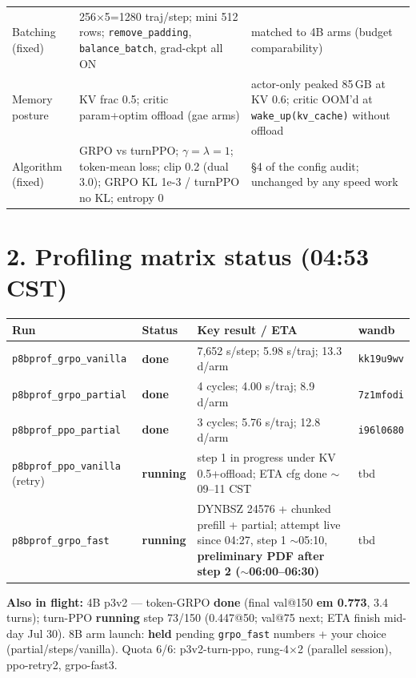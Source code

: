 \documentclass[10pt]{article}
\newcommand{\code}[1]{\texttt{\small #1}}
\newcommand{\ok}{\textcolor{green!55!black}{\textbf{done}}}
\newcommand{\run}{\textcolor{orange!85!black}{\textbf{running}}}
\begin{document}
\begin{tabular}{p{3.4cm}p{4.3cm}p{8.2cm}}
Batching (fixed) & 256$\times$5=1280 traj/step; mini 512 rows; \code{remove\_padding}, \code{balance\_batch}, grad-ckpt all ON & matched to 4B arms (budget comparability)\\
Memory posture & KV frac 0.5; critic param+optim offload (gae arms) & actor-only peaked 85\,GB at KV 0.6; critic OOM'd at \code{wake\_up(kv\_cache)} without offload\\
Algorithm (fixed) & GRPO vs turnPPO; $\gamma{=}\lambda{=}1$; token-mean loss; clip 0.2 (dual 3.0); GRPO KL 1e-3 / turnPPO no KL; entropy 0 & \S4 of the config audit; unchanged by any speed work\\
\bottomrule
\end{tabular}
\normalsize

\section*{2. Profiling matrix status (04:53 CST)}
\small
\begin{tabular}{llll}
\toprule
\textbf{Run} & \textbf{Status} & \textbf{Key result / ETA} & \textbf{wandb}\\
\midrule
\code{p8bprof\_grpo\_vanilla} & \ok & 7,652 s/step; 5.98 s/traj; 13.3 d/arm & \code{kk19u9wv}\\
\code{p8bprof\_grpo\_partial} & \ok & 4 cycles; 4.00 s/traj; 8.9 d/arm & \code{7z1mfodi}\\
\code{p8bprof\_ppo\_partial} & \ok & 3 cycles; 5.76 s/traj; 12.8 d/arm & \code{i96l0680}\\
\code{p8bprof\_ppo\_vanilla} (retry) & \run & step 1 in progress under KV 0.5+offload; ETA cfg done $\sim$09--11 CST & tbd\\
\code{p8bprof\_grpo\_fast} & \run & DYNBSZ 24576 + chunked prefill + partial; attempt live since 04:27, step 1 $\sim$05:10, \textbf{preliminary PDF after step 2 ($\sim$06:00--06:30)} & tbd\\
\bottomrule
\end{tabular}
\normalsize

\vspace{0.5em}\noindent\textbf{Also in flight:} 4B p3v2 --- token-GRPO \ok{} (final val@150 \textbf{em 0.773}, 3.4 turns);
turn-PPO \run{} step 73/150 (0.447@50; val@75 next; ETA finish mid-day Jul 30).
8B arm launch: \textbf{held} pending \code{grpo\_fast} numbers + your choice (partial/steps/vanilla).
Quota 6/6: p3v2-turn-ppo, rung-4$\times$2 (parallel session), ppo-retry2, grpo-fast3.
\end{document}
